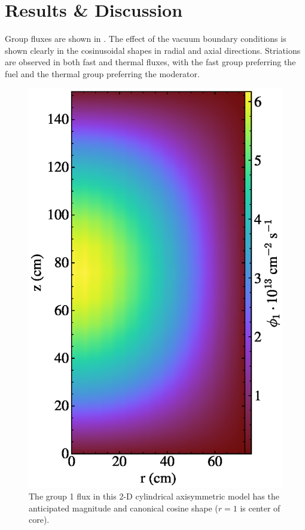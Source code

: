 \documentclass{article}
\let\Oldsection\section
\renewcommand{\section}{\FloatBarrier\Oldsection}
\begin{document}
\section{Results \& Discussion}

Group fluxes are shown in . The effect of the vacuum
boundary conditions is shown clearly in the cosinusoidal shapes in radial and
axial directions. Striations are observed in both fast and thermal fluxes, with
the fast group preferring the fuel and the thermal group preferring the moderator.

\begin{figure}
  \centering
  \includegraphics{auto_diff_rho_group1.eps}
        \caption{The group 1 flux in this 2-D cylindrical axisymmetric model 
        has the anticipated magnitude and canonical cosine shape ($r=1$ is center of core). }
  \label{fig:group1}
\end{figure}
\end{document}

